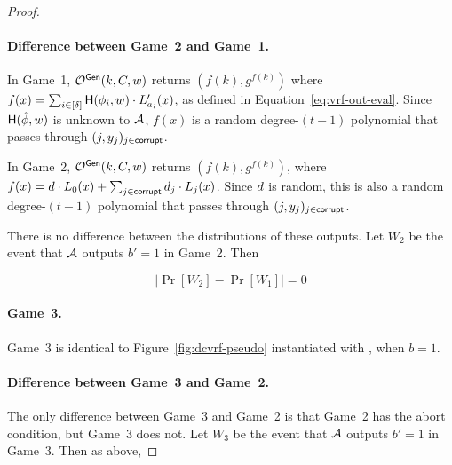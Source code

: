 \begin{proof}
  \begin{sloppypar}
  \paragraph{Difference between Game~2 and Game~1.}
  In Game~1, $\mathcal{O}^{\mathsf{Gen}}(k, C, w)$ returns
  $(f(k), g^{f(k)})$ where
  $f(x) = \sum_{i \in [\delta]} \mathsf{H}(\phi_i, w) \cdot L'_{a_i}(x)$,
  as defined in Equation~\ref{eq:vrf-out-eval}.
  Since $\mathsf{H}(\hat{\phi}, w)$ is unknown to $\mathcal{A}$,
  $f(x)$ is a random degree-$(t-1)$ polynomial
  that passes through $(j,y_j)_{j \in \mathsf{corrupt}}$.
  \end{sloppypar}

  In Game~2, $\mathcal{O}^{\mathsf{Gen}}(k, C, w)$ returns $(f(k), g^{f(k)})$,
  where $f(x) =  d \cdot L_0(x) + \sum_{j \in \mathsf{corrupt}} d_j \cdot L_j(x)$.
  Since $d$ is random,
  this is also a random degree-$(t-1)$ polynomial that passes through $(j,y_j)_{j \in \mathsf{corrupt}}$.

  There is no difference between the distributions of these outputs.
  Let $W_2$ be the event that $\mathcal{A}$ outputs $b'=1$ in Game~2. Then

  \begin{equation} \label{eq:dcvrf-game2}
    \lvert \Pr[W_2] - \Pr[W_1] \rvert = 0
  \end{equation}



  \paragraph{\underline{Game~3.}}
  Game~3 is
  identical to Figure~\ref{fig:dcvrf-pseudo} instantiated with \DVRFOne,
  when $b=1$.


  \paragraph{Difference between Game~3 and Game~2.}
  The only difference between Game~3 and Game~2 is that Game~2 has the abort condition, but Game~3 does not.
  Let $W_3$ be the event that $\mathcal{A}$ outputs $b'=1$ in Game~3.
  Then as above,


\end{proof}
